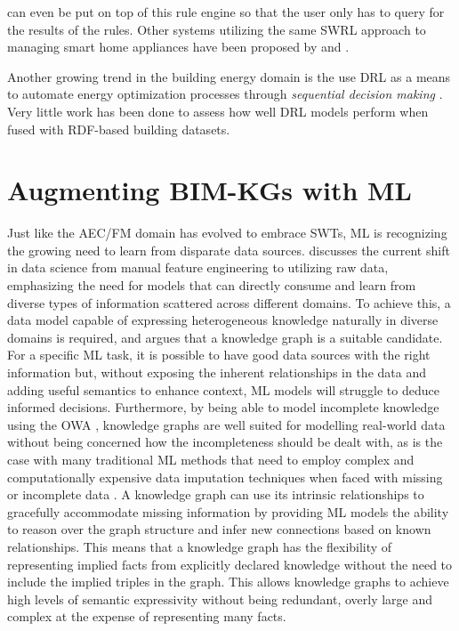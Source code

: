 can even be put on top of this rule engine so that the user only has to query for the results of the rules. Other systems utilizing the same \ac{SWRL} approach to managing smart home appliances have been proposed by \cite{Ricquebourg2007} and \cite{Tomic2010}.

Another growing trend in the building energy domain is the use \ac{DRL} as a means to automate energy optimization processes through \emph{sequential decision making} \citep{LeCun2015,Sutton1988}. Very little work has been done to assess how well \ac{DRL} models perform when fused with \ac{RDF}-based building datasets.


\section{Augmenting \acp{BIM-KG} with \acf{ML}}
\label{Knowledge graphs with DRL}

Just like the \ac{AEC/FM} domain has evolved to embrace \acp{SWT}, \ac{ML} is recognizing the growing need to learn from disparate data sources. \cite{Wilcke2017} discusses the current shift in data science from manual feature engineering to utilizing raw data, emphasizing the need for models that can directly consume and learn from diverse types of information scattered across different domains. To achieve this, a data model capable of expressing heterogeneous knowledge naturally in diverse domains is required, and \cite{Wilcke2017} argues that a knowledge graph is a suitable candidate. For a specific \ac{ML} task, it is possible to have good data sources with the right information but, without exposing the inherent relationships in the data and adding useful semantics to enhance context, \ac{ML} models will struggle to deduce informed decisions. Furthermore, by being able to model incomplete knowledge using the \ac{OWA} \citep{Berners-Lee2001,Berners-Lee2001a}, knowledge graphs are well suited for modelling real-world data without being concerned how the incompleteness should be dealt with, as is the case with many traditional \ac{ML} methods that need to employ complex and computationally expensive data imputation techniques when faced with missing or incomplete data \citep{Cunningham2007, Sterne2009, Priya2015}. A knowledge graph can use its intrinsic relationships to gracefully accommodate missing information by providing \ac{ML} models the ability to reason over the graph structure and infer new connections based on known relationships. This means that a knowledge graph has the flexibility of representing implied facts from explicitly declared knowledge without the need to include the implied triples in the graph. This allows knowledge graphs to achieve high levels of semantic expressivity without being redundant, overly large and complex at the expense of representing many facts.

